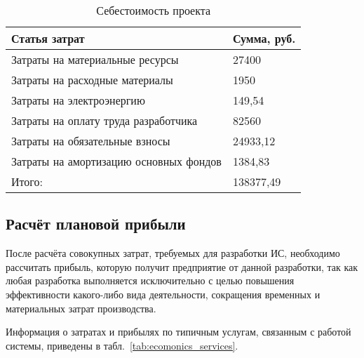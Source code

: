 \begin{myTable}
\begin{longtable}[h]{|p{}|p{}|}
	\caption{\label{tab:sebest}Себестоимость проекта} \\
	\hline
		\textbf{Статья затрат} &
		\textbf{Сумма, руб.} \\
	\hline
		Затраты на материальные ресурсы & 27400 \\ \hline
		Затраты на расходные материалы & 1950 \\ \hline
		Затраты на электроэнергию & 149,54 \\ \hline
		Затраты на оплату труда разработчика & 82560 \\ \hline
		Затраты на обязательные взносы & 24933,12 \\ \hline
		Затраты на амортизацию основных фондов & 1384,83 \\ \hline
		Итого: & 138377,49 \\ \hline
\end{longtable}
\end{myTable}

\subsection{Расчёт плановой прибыли}

После расчёта совокупных затрат, требуемых для разработки ИС, необходимо рассчитать прибыль, которую получит предприятие от данной разработки, так как любая разработка выполняется исключительно с целью повышения эффективности какого-либо вида деятельности, сокращения временных и материальных затрат производства.

Информация о затратах и прибылях по типичным услугам, связанным с работой системы, приведены в табл.~\ref{tab:ecomonics_services}.

